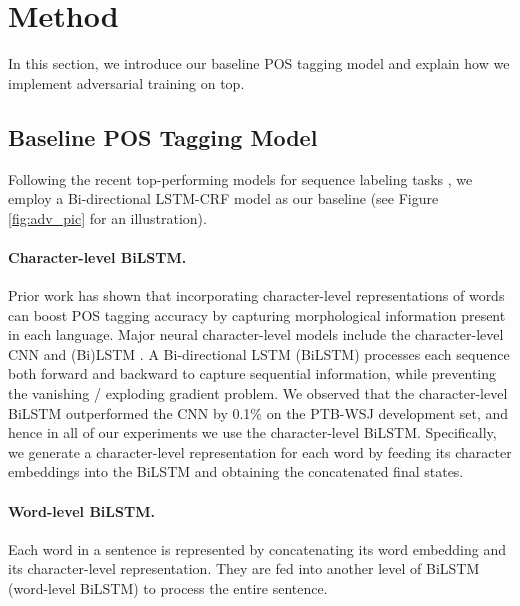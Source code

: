 \documentclass[11pt,a4paper]{article}
\begin{document}
\section{Method}
In this section, we introduce our baseline POS tagging model and explain how we implement adversarial training on top.


\subsection{Baseline POS Tagging Model}
Following the recent top-performing models for sequence labeling tasks \cite{plank2016multilingual,Lample2016ner,ma-hovy:2016:P16-1},
we employ a Bi-directional LSTM-CRF model as our baseline (see Figure \ref{fig:adv_pic} for an illustration).


\paragraph{Character-level BiLSTM.}
Prior work has shown that incorporating character-level representations of words can boost POS tagging accuracy by capturing morphological information present in each language.
Major neural character-level models 
include the character-level CNN \cite{ma-hovy:2016:P16-1} and (Bi)LSTM \cite{dozat-qi-manning:2017:K17-3}.
A Bi-directional LSTM (BiLSTM) \cite{Hochreiter:1997:LSM:1246443.1246450,Schuster:1997:BRN:2198065.2205129} processes each sequence both forward and backward to capture sequential information,
while preventing the vanishing \!/\! exploding gradient problem.
We observed that the character-level BiLSTM outperformed the CNN by 0.1\% on the PTB-WSJ development set, and hence in all of our experiments
we use the character-level BiLSTM.
Specifically, we generate a character-level representation for each word
by feeding its character embeddings into the BiLSTM and obtaining the 
concatenated final states.

\paragraph{Word-level BiLSTM.}

Each word in a sentence is represented by concatenating its word embedding and its character-level representation.
They are fed into another level of BiLSTM (word-level BiLSTM) to process the entire sentence.
\end{document}
